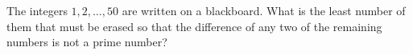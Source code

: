 The integers $1,2,\dots,50$ are written on a blackboard. What is the least number of them that must be erased so that the difference of any two of the remaining numbers is not a prime number?

